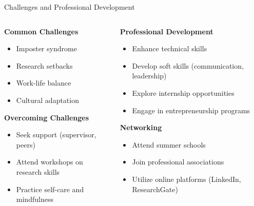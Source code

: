 \documentclass[aspectratio=169,10pt]{beamer}
\begin{document}
\begin{frame}{Challenges and Professional Development}
    \begin{columns}[T]
        \begin{column}{0.5\textwidth}
            \textbf{Common Challenges}
            \begin{itemize}
                \item Imposter syndrome
                \item Research setbacks
                \item Work-life balance
                \item Cultural adaptation
            \end{itemize}
            
            \textbf{Overcoming Challenges}
            \begin{itemize}
                \item Seek support (supervisor, peers)
                \item Attend workshops on research skills
                \item Practice self-care and mindfulness
            \end{itemize}
        \end{column}
        \begin{column}{0.5\textwidth}
            \textbf{Professional Development}
            \begin{itemize}
                \item Enhance technical skills
                \item Develop soft skills (communication, leadership)
                \item Explore internship opportunities
                \item Engage in entrepreneurship programs
            \end{itemize}
            
            \textbf{Networking}
            \begin{itemize}
                \item Attend summer schools
                \item Join professional associations
                \item Utilize online platforms (LinkedIn, ResearchGate)
            \end{itemize}
        \end{column}
    \end{columns}
\end{frame}
\end{document}
